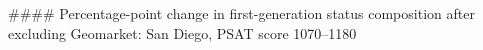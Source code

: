 #### Percentage-point change in first-generation status composition after excluding Geomarket: San Diego, PSAT score 1070–1180
